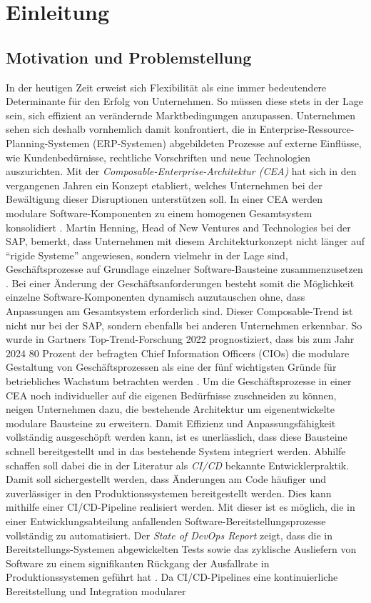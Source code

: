 \section{Einleitung}

\subsection{Motivation und Problemstellung}
In der heutigen Zeit erweist sich Flexibilität als eine immer bedeutendere Determinante für den Erfolg von Unternehmen. So müssen diese stets in der Lage sein, sich effizient an verändernde Marktbedingungen anzupassen. Unternehmen sehen sich deshalb vornhemlich damit konfrontiert, die in Enterprise-Ressource-Planning-Systemen (\acs{ERP}-Systemen) abgebildeten Prozesse auf externe Einflüsse, wie Kundenbedürnisse, rechtliche Vorschriften und neue Technologien auszurichten. Mit der \textit{Composable-Enterprise-Architektur (CEA)} hat sich in den vergangenen Jahren ein Konzept etabliert, welches Unternehmen bei der Bewältigung dieser Disruptionen unterstützen soll. In einer CEA werden modulare Software-Komponenten zu einem homogenen Gesamtsystem konsolidiert \cite{.20230313}. Martin Henning, Head of New Ventures and Technologies bei der SAP, bemerkt, dass Unternehmen mit diesem Architekturkonzept nicht länger auf \enquote{rigide Systeme} angewiesen, sondern vielmehr in der Lage sind, Geschäftsprozesse auf Grundlage einzelner Software-Bausteine zusammenzusetzen \cite{Galer.20221019}. Bei einer Änderung der Geschäftsanforderungen besteht somit die Möglichkeit einzelne Software-Komponenten dynamisch auzutauschen ohne, dass Anpassungen am Gesamtsystem erforderlich sind. Dieser Composable-Trend ist nicht nur bei der SAP, sondern ebenfalls bei anderen Unternehmen erkennbar. So wurde in Gartners Top-Trend-Forschung 2022 prognostiziert, dass bis zum Jahr 2024 80 Prozent der befragten Chief Information Officers (\acs{CIO}s) die modulare Gestaltung von Geschäftsprozessen als eine der fünf wichtigsten Gründe für betriebliches Wachstum betrachten werden \cite{Gartner.20230408}. Um die Geschäftsprozesse in einer CEA noch individueller auf die eigenen Bedürfnisse zuschneiden zu können, neigen Unternehmen dazu, die bestehende Architektur um eigenentwickelte modulare Bausteine zu erweitern. Damit Effizienz und Anpassungsfähigkeit vollständig ausgeschöpft werden kann, ist es unerlässlich, dass diese Bausteine schnell bereitgestellt und in das bestehende System integriert werden. Abhilfe schaffen soll dabei die in der Literatur als \textit{\ac{CI/CD}} bekannte Entwicklerpraktik. Damit soll sichergestellt werden, dass Änderungen am Code häufiger und zuverlässiger in den Produktionssystemen bereitgestellt werden. Dies kann mithilfe einer CI/CD-Pipeline realisiert werden. Mit dieser ist es möglich, die in einer Entwicklungsabteilung anfallenden Software-Bereitstellungsprozesse vollständig zu automatisiert. Der \textit{State of DevOps Report} zeigt, dass die in Bereitstellungs-Systemen abgewickelten Tests sowie das zyklische Ausliefern von Software zu einem signifikanten Rückgang der Ausfallrate in Produktionssystemen geführt hat \cite{GoogleCloud.20230313}. Da CI/CD-Pipelines eine kontinuierliche Bereitstellung und Integration modularer 